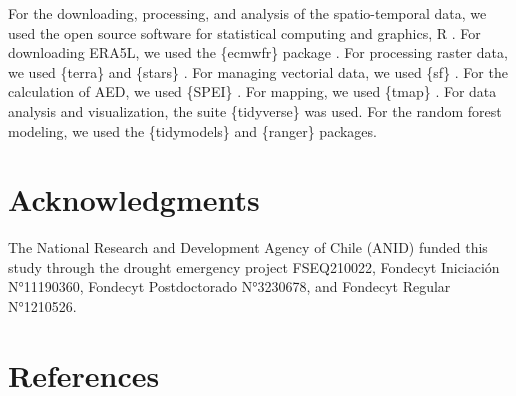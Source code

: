 \documentclass[
  sn-nature,
  numbered]{sn-jnl}
\begin{document}
For the downloading, processing, and analysis of the spatio-temporal
data, we used the open source software for statistical computing and
graphics, R \citep{R2023}. For downloading ERA5L, we used the \{ecmwfr\}
package \citep{Hufkens2019}. For processing raster data, we used
\{terra\} \citep{Hijmans2023} and \{stars\} \citep{Pebesma2023}. For
managing vectorial data, we used \{sf\} \citep{Pebesma2018}. For the
calculation of AED, we used \{SPEI\} \citep{Bergueria2023}. For mapping,
we used \{tmap\} \citep{Tennekes2018}. For data analysis and
visualization, the suite \{tidyverse\} \citep{Wickham2019} was used. For
the random forest modeling, we used the \{tidymodels\} \citep{Kuhn2020}
and \{ranger\} \citep{Wright2017} packages.

\section*{Acknowledgments}\label{acknowledgments}

The National Research and Development Agency of Chile (ANID) funded this
study through the drought emergency project FSEQ210022, Fondecyt
Iniciación N°11190360, Fondecyt Postdoctorado N°3230678, and Fondecyt
Regular N°1210526.

\section{References}\label{references}

\renewcommand{\bibsection}{}

\end{document}
